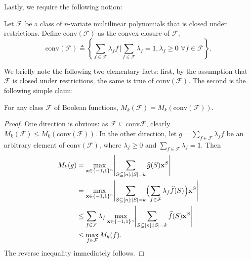 Lastly, we require the following notion:

\begin{definition}
Let $\mathcal{F}$ be a class of $n$-variate multilinear polynomials that is closed under restrictions.  Define $\mathrm{conv}(\mathcal{F})$ as the convex closure of $\mathcal{F}$,
\begin{equation*}
    \mathrm{conv}(\mathcal{F})\triangleq \left\{\sum_{f\in \mathcal{F}} \lambda_f f\,\bigg\vert \sum_{f\in \mathcal{F}} \lambda_f=1, \lambda_f\geq 0 \,\,\forall f\in \mathcal{F}\right\}.
\end{equation*}
\end{definition}
We briefly note the following two elementary facts: first, by the assumption that $\mathcal{F}$ is closed under restrictions, the same is true of $\mathrm{conv}(\mathcal{F})$. The second is the following simple claim:

\begin{lemma}
For any class $\mathcal{F}$ of Boolean functions, $M_k(\mathcal{F})=M_k(\mathrm{conv}(\mathcal{F}))$.
\end{lemma}
\begin{proof}
One direction is obvious: as $\mathcal{F}\subseteq \mathrm{conv}\mathcal{F}$, clearly $M_k(\mathcal{F})\leq M_k(\mathrm{conv}(\mathcal{F}))$. In the other direction, let $g=\sum_{f\in \mathcal{F}} \lambda_f f$ be an arbitrary element of $\mathrm{conv}(\mathcal{F})$, where $\lambda_f\geq 0$ and $\sum_{f\in \mathcal{F}}\lambda_f=1$. Then
\begin{align*}
    M_k(g) &= \max_{\mathbf{x}\in \{-1,1\}^n} \Biggl| \sum_{S\subseteq [n]:\vert S\vert=k} \widehat{g}(S) \mathbf{x}^S \Biggr| \\
    &=\max_{\mathbf{x}\in \{-1,1\}^n} \Biggl| \sum_{S\subseteq [n]:\vert S\vert=k} \Bigl( \sum_{f\in \mathcal{F}}\lambda_f\widehat{f}(S) \Bigr) \mathbf{x}^S \Biggr| \\
    &\leq \sum_{f\in \mathcal{F}} \lambda_f \max_{\mathbf{x}\in \{-1,1\}^n} \Biggl| \sum_{S\subseteq [n]:\vert S\vert=k} \widehat{f}(S) \mathbf{x}^S \Biggr| \\
    &\leq \max_{f\in \mathcal{F}} M_k(f).
\end{align*}
The reverse inequality immediately follows.
\end{proof}










































